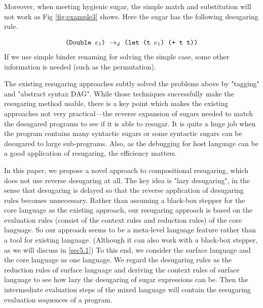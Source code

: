 Moreover, when meeting hygienic sugar, the simple match and substitution will not work as Fig \ref{fig:example3} shows. Here the  sugar has the following desugaring rule.

\[
\begin{array}{l}
\texttt{(Double $e_1$)} ~\rightarrow_d~ \texttt{(let (t $e_1$) (+ t t))}\\
\end{array}
\]
If we use simple binder renaming for solving the simple case, some other information is needed (such as the permutation).



The existing resugaring approaches subtly solved the problems above by "tagging"\cite{resugaring} and "abstract syntax DAG"\cite{hygienic}. While those techniques successfully make the resugaring method usable, there is a key point which makes the existing approaches not very practical---the reverse expansion of sugars needed to match the desugared programs to see if it is able to resugar. It is quite a huge job when the program contains many syntactic sugars or some syntactic sugars can be desugared to large sub-programs.
Also, as the debugging for host language can be a good application of resugaring, the efficiency matters.



\label{mark:mention}
In this paper, we propose a novel approach to compositional resugaring, which does not use reverse desugaring at all.
The key idea is "lazy desugaring", in the sense that desugaring is delayed so that the reverse application of desugaring rules becomes unnecessary. Rather than assuming a black-box stepper for the core language as the existing approach, our resugaring approach is based on the evaluation rules (consist of the context rules and reduction rules) of the core language. So our approach seems to be a meta-level language feature rather than a tool for existing language. (Although it can also work with a black-box stepper, as we will discuss in \ref{sec5.1})
To this end, we consider the surface language and the core language as one language. We regard the desugaring rules as the reduction rules of surface language and deriving the context rules of surface language to see how lazy the desugaring of sugar expressions can be. Then the intermediate evaluation steps of the mixed language will contain the resugaring evaluation sequences of a program.



